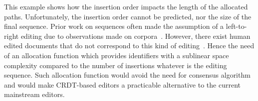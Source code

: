 This example shows how the insertion order impacts the length of the allocated
paths. Unfortunately, the insertion order cannot be predicted, nor the size of
the final sequence. Prior work on sequences often made the assumption of a
left-to-right editing due to observations made on
corpora~\cite{preguica2009commutative, weiss2009logoot}. However, there exist
human edited documents that do not correspond to this kind of
editing~\cite{nedelec2013lseq}.
Hence the need of an allocation function which provides identifiers with a
sublinear space complexity compared to the number of insertions whatever is the
editing sequence. Such allocation function would avoid the need for consensus
algorithm~\cite{mostefaoui2015signature} and would make CRDT-based editors a
practicable alternative to the current mainstream editors.
 
